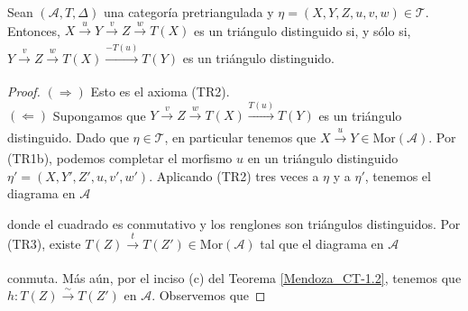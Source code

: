 \documentclass[tesis]{subfiles}
\begin{document}
\begin{Prop}\label{Mendoza_CT-1.3}
    
    Sean $(\mathscr{A},T,\Delta)$ una categoría pretriangulada y $\eta=(X,Y,Z,u,v,w)\in\mathscr{T}$. Entonces, $X\xrightarrow[]{u}Y\xrightarrow[]{v}Z\xrightarrow[]{w}T(X)$ es un triángulo distinguido si, y sólo si, $Y\xrightarrow[]{v}Z\xrightarrow[]{w}T(X)\xrightarrow[]{-T(u)} T(Y)$ es un triángulo distinguido.
\end{Prop}

\begin{proof}\leavevmode

    $(\Rightarrow)$ Esto es el axioma (TR2). \\

    $(\Leftarrow)$ Supongamos que $Y\xrightarrow[]{v}Z\xrightarrow[]{w}T(X)\xrightarrow[]{T(u)}T(Y)$ es un triángulo distinguido. Dado que $\eta\in\mathscr{T}$, en particular tenemos que $X\xrightarrow[]{u}Y\in\text{Mor}(\mathscr{A})$. Por (TR1b), podemos completar el morfismo $u$ en un triángulo distinguido $\eta' = (X,Y',Z',u,v',w')$. Aplicando (TR2) tres veces a $\eta$ y a $\eta'$, tenemos el diagrama en $\mathscr{A}$
    \begin{center}
    \end{center}
    donde el cuadrado es conmutativo y los renglones son triángulos distinguidos. Por (TR3), existe $T(Z)\xrightarrow[]{t}T(Z')\in\text{Mor}(\mathscr{A})$ tal que el diagrama en $\mathscr{A}$
    \begin{center}
    \end{center}
    conmuta. Más aún, por el inciso (c) del Teorema \ref{Mendoza_CT-1.2}, tenemos que $h:T(Z)\xrightarrow[]{\sim}T(Z')$ en $\mathscr{A}$. Observemos que

\end{proof}
\end{document}
